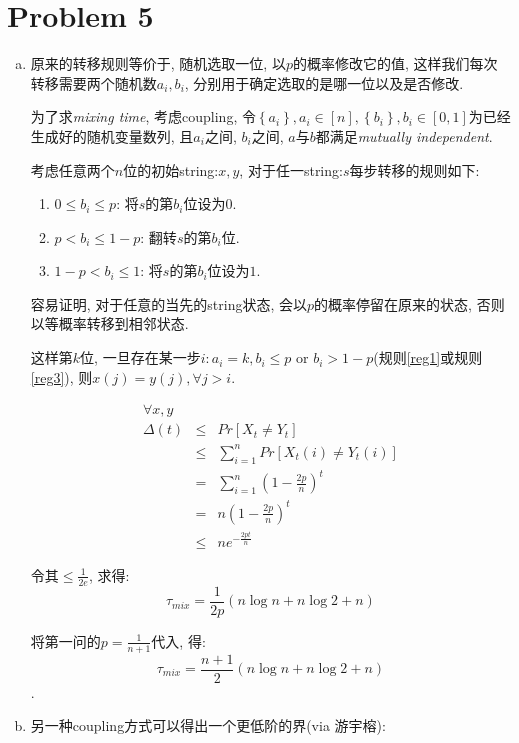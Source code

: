 \documentclass[paper=a4, fontsize=11pt]{scrartcl} %
\numberwithin{figure}{section} %
\numberwithin{table}{section} %
\begin{document}
\section*{Problem 5}
\begin{enumerate}[(a)]
	\item 
	原来的转移规则等价于, 随机选取一位, 以$p$的概率修改它的值, 这样我们每次转移需要两个随机数$a_i,b_i$, 分别用于确定选取的是哪一位以及是否修改.

	为了求\textit{mixing time}, 考虑coupling, 令$\left\{a_i\right\}, a_i\in[n], \left\{b_i\right\}, b_i\in[0, 1]$为已经生成好的随机变量数列, 且$a_i$之间, $b_i$之间, $a$与$b$都满足\textit{mutually independent}.

	考虑任意两个$n$位的初始string:$x, y$, 对于任一string:$s$每步转移的规则如下:
	\begin{enumerate}	
		\item \label{reg1}
		$0\leq b_i \leq p$: 将$s$的第$b_i$位设为$0$. 
		\item \label{reg2}
		$p < b_i \leq 1 - p$: 翻转$s$的第$b_i$位.
		\item \label{reg3}
		$1 - p < b_i \leq 1$: 将$s$的第$b_i$位设为$1$.
	\end{enumerate}

	容易证明, 对于任意的当先的string状态, 会以$p$的概率停留在原来的状态, 否则以等概率转移到相邻状态.

	这样第$k$位, 一旦存在某一步$i: a_i = k, b_i \leq p \textrm{ or } b_i > 1-p$(规则\ref{reg1}或规则\ref{reg3}), 则$x(j) = y(j), \forall j > i$.

	\begin{eqnarray*}
		\forall x, y & & \\
		\Delta(t)& \leq & \textit{Pr}\left[
			X_t\not= Y_t\right] \\
			& \leq & \sum_{i=1}^{n}\textit{Pr}\left[X_t(i)\not=Y_t(i)\right] \\
			& = & \sum_{i=1}^{n}\left(1 - \frac{2p}{n}\right)^t \\
			& = & n\left(1-\frac{2p}{n}\right)^t \\
			& \leq & ne^{-\frac{2pt}{n}}
	\end{eqnarray*}

	令其$\leq \frac{1}{2e}$, 求得:
	$$\tau_{mix} = \frac{1}{2p}\left(n\log n + n\log 2 + n\right) $$

	将第一问的$p = \frac{1}{n+1}$代入, 得:
	$$\tau_{mix} = \frac{n+1}{2}\left(n\log n + n\log 2 + n\right) $$.
\item
	另一种coupling方式可以得出一个更低阶的界(via 游宇榕):


\end{enumerate}
\end{document}
